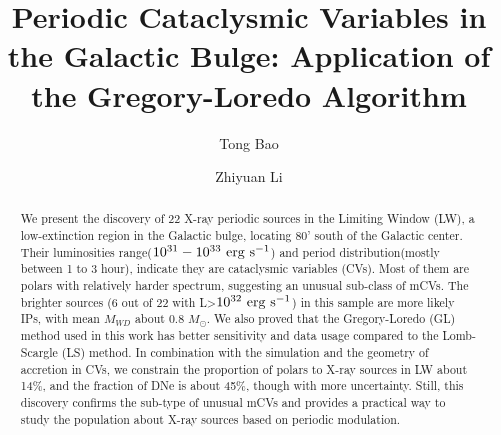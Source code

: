\documentclass[twoside,twocolumn]{aastex63}
\begin{document}
\title{Periodic Cataclysmic Variables in the Galactic Bulge: Application of the Gregory-Loredo Algorithm}


\author{Tong Bao}
\author{Zhiyuan Li}
\begin{abstract}
We present the discovery of 22 X-ray periodic sources in the Limiting Window (LW), a low-extinction region in the Galactic bulge, locating 80' south of the Galactic center. Their luminosities range(${\rm 10^{31}-10^{33} ~erg ~ s^{-1}}$) and period distribution(mostly between 1 to 3 hour), indicate they are cataclysmic variables (CVs). Most of them are polars with relatively harder spectrum, suggesting an unusual sub-class of mCVs.
The brighter sources (6 out of 22 with L>$\rm 10^{32} ~erg~s^{-1}$) in this sample are more likely IPs, with mean $M_{WD}$ about 0.8 $M_\odot$.
We also proved that the Gregory-Loredo (GL) method used in this work has better sensitivity and data usage compared to the Lomb-Scargle (LS) method. In combination with the simulation and the geometry of accretion in CVs, we constrain the proportion of polars to X-ray sources in LW about 14\%, and the fraction of DNe is about 45\%, though with more uncertainty. Still, this discovery confirms the sub-type of unusual mCVs and provides a practical way to study the population about X-ray sources based on periodic modulation.
\end{abstract}

\end{document}
